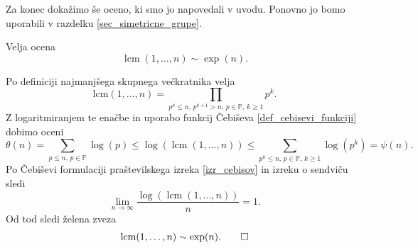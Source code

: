 Za konec dokažimo še oceno, ki smo jo napovedali v uvodu. Ponovno jo bomo uporabili v razdelku \ref{sec_simetricne_grupe}.
\begin{lema}
  \label{lem_lcm_exp_n}
  Velja ocena \begin{equation*}
  \operatorname{lcm}(1, \ldots, n) \sim \exp(n).
  \end{equation*}  
  \end{lema}
  \begin{dokaz}
  Po definiciji najmanjšega skupnega večkratnika velja \begin{equation*}
  \text{lcm}(1, \ldots, n) = \prod_{p^{k} \le n, \, p^{k + 1} > n,\,   p \in \mathbb{P}, \, k \ge 1 } p^{k}.
  \end{equation*}  
  Z logaritmiranjem te enačbe in uporabo funkcij Čebiševa \ref{def_cebisevi_funkciji} dobimo oceni \begin{equation*}
  \theta(n) = \sum_{p \le n, \,   p \in \mathbb{P}} \log(p) \le \log(\operatorname{lcm}(1, \ldots ,n)) \le  \sum_{p^{k} \le n, \, p \in \mathbb{P}, \, k \ge 1 } \log(p^{k}) = \psi(n).
  \end{equation*}  
  Po Čebiševi formulaciji praštevilskega izreka \ref{izr_cebisov} in izreku o sendviču sledi \begin{equation*}
  \lim_{n \to \infty} \frac{\log(\operatorname{lcm}(1, \ldots, n))}{n} = 1.
  \end{equation*}  
    Od tod sledi želena zveza \begin{equation*}
      \operatorname{lcm}(1, \ldots, n) \sim \exp(n). \qedhere
  \end{equation*} 
  \end{dokaz}




